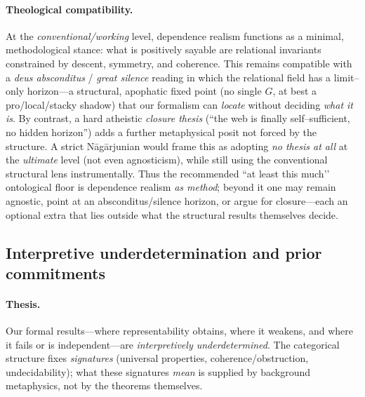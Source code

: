\documentclass[11pt]{article}
\theoremstyle{upright}
\begin{document}
\paragraph{Theological compatibility.}
At the \emph{conventional/working} level, dependence realism functions as a minimal, methodological stance: what is positively sayable are relational invariants constrained by descent, symmetry, and coherence. This remains compatible with a \emph{deus absconditus} / \emph{great silence} reading in which the relational field has a limit–only horizon—a structural, apophatic fixed point (no single $G$, at best a pro/local/stacky shadow) that our formalism can \emph{locate} without deciding \emph{what it is}. By contrast, a hard atheistic \emph{closure thesis} (“the web is finally self–sufficient, no hidden horizon”) adds a further metaphysical posit not forced by the structure. A strict Nāgārjunian would frame this as adopting \emph{no thesis at all} at the \emph{ultimate} level (not even agnosticism), while still using the conventional structural lens instrumentally. Thus the recommended “at least this much’’ ontological floor is dependence realism \emph{as method}; beyond it one may remain agnostic, point at an absconditus/silence horizon, or argue for closure—each an optional extra that lies outside what the structural results themselves decide.

\subsection{Interpretive underdetermination and prior commitments}\label{subsec:underdetermination}
\paragraph{Thesis.}
Our formal results—where representability obtains, where it weakens, and where it fails or is independent—are \emph{interpretively underdetermined}. The categorical structure fixes \emph{signatures} (universal properties, coherence/obstruction, undecidability); what these signatures \emph{mean} is supplied by background metaphysics, not by the theorems themselves.
\end{document}
